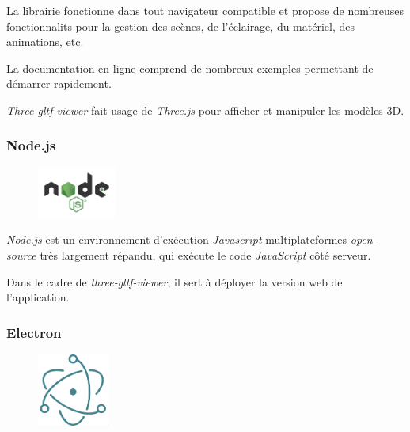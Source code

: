 La librairie fonctionne dans tout navigateur compatible  et propose de nombreuses fonctionnalits pour la gestion des scènes, de l'éclairage, du matériel, des animations, etc.

La documentation en ligne comprend de nombreux exemples permettant de démarrer rapidement.

\textit{Three-gltf-viewer} fait usage de \textit{Three.js} pour afficher et manipuler les modèles 3D.

\subsubsection{Node.js}

\begin{figure}
  \begin{center}
    \includegraphics[width=0.23\textwidth]{Figures/nodejs-logo.png}
  \end{center}
\end{figure}

\textit{Node.js} est un environnement d'exécution \textit{Javascript} multiplateformes \textit{open-source} très largement répandu, qui exécute le code \textit{JavaScript} côté serveur.

Dans le cadre de \textit{three-gltf-viewer}, il sert à déployer la version web de l'application.

\subsubsection{Electron}

\begin{figure}
  \begin{center}
    \includegraphics[width=0.21\textwidth]{Figures/electron-logo.png}
  \end{center}
\end{figure}

